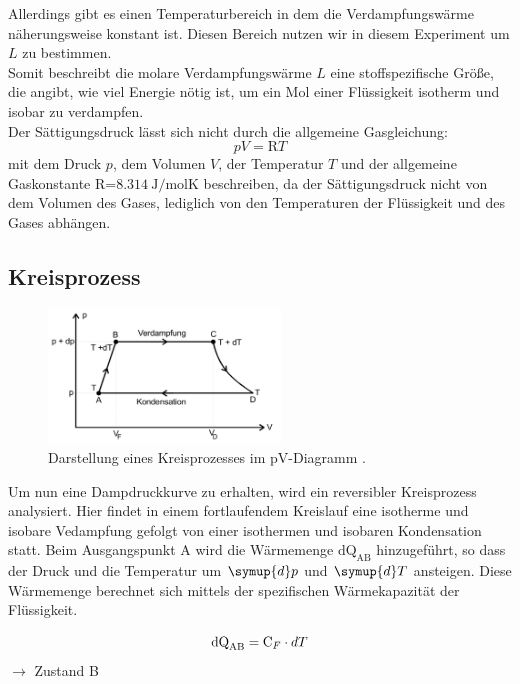 Allerdings gibt es einen Temperaturbereich in dem die Verdampfungswärme näherungsweise konstant ist.
Diesen Bereich nutzen wir in diesem Experiment um $L$ zu bestimmen.\\
Somit beschreibt die molare Verdampfungswärme $L$ eine stoffspezifische Größe, die angibt, wie viel Energie nötig ist,
um ein Mol einer Flüssigkeit isotherm und isobar zu verdampfen.\\
Der Sättigungsdruck lässt sich nicht durch die allgemeine Gasgleichung:
\begin{equation}
    pV=\text{R}T
    \label{eqn:Gasgl}
\end{equation}
mit dem Druck $p$, dem Volumen $V$, der Temperatur $T$ und der allgemeine Gaskonstante R=$\SI{8.314}{\joule\per\mole\kelvin}$ 
beschreiben, da der Sättigungsdruck nicht von dem Volumen des Gases, lediglich von den Temperaturen der Flüssigkeit 
und des Gases abhängen.
\\

\subsection{Kreisprozess}

\begin{figure}[H]
    \centering
    \includegraphics[width=0.55\textwidth]{images/Kreislauf.PNG}
    \caption{Darstellung eines Kreisprozesses im pV-Diagramm \protect \cite{V203}.}
    \label{img:Kreislauf}
\end{figure}

\noindent Um nun eine Dampdruckkurve zu erhalten, wird ein reversibler Kreisprozess analysiert. Hier findet in einem fortlaufendem 
Kreislauf eine isotherme und isobare Vedampfung gefolgt von einer isothermen und isobaren Kondensation statt.
Beim Ausgangspunkt A wird die Wärmemenge $\text{dQ}_\text{AB} $ hinzugeführt, so dass der Druck und die Temperatur um $\symup{d}p$ und $\symup{d}T$ ansteigen.
Diese Wärmemenge berechnet sich mittels der spezifischen Wärmekapazität der Flüssigkeit.

\begin{equation}
    \text{dQ}_\text{AB}= \text{C}_F \cdot dT \nonumber\\
\end{equation}
$\rightarrow$ Zustand B\\

